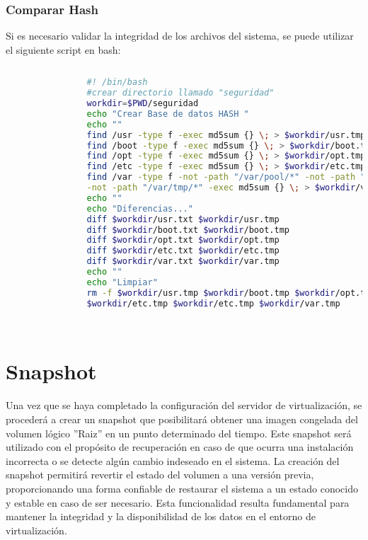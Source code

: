 			
			\subsubsection{Comparar Hash}
			
			Si es necesario validar la integridad de los archivos del sistema, se puede utilizar el siguiente script en bash:
			
			\vspace{0.3cm}
			\begin{lstlisting}[language=Bash, caption=Comparar Hash]
				
				#! /bin/bash
				#crear directorio llamado "seguridad"
				workdir=$PWD/seguridad
				echo "Crear Base de datos HASH "
				echo ""
				find /usr -type f -exec md5sum {} \; > $workdir/usr.tmp
				find /boot -type f -exec md5sum {} \; > $workdir/boot.tmp
				find /opt -type f -exec md5sum {} \; > $workdir/opt.tmp
				find /etc -type f -exec md5sum {} \; > $workdir/etc.tmp
				find /var -type f -not -path "/var/pool/*" -not -path "/var/log/*" \
				-not -path "/var/tmp/*" -exec md5sum {} \; > $workdir/var.tmp
				echo ""
				echo "Diferencias..."
				diff $workdir/usr.txt $workdir/usr.tmp
				diff $workdir/boot.txt $workdir/boot.tmp
				diff $workdir/opt.txt $workdir/opt.tmp
				diff $workdir/etc.txt $workdir/etc.tmp
				diff $workdir/var.txt $workdir/var.tmp
				echo ""
				echo "Limpiar"
				rm -f $workdir/usr.tmp $workdir/boot.tmp $workdir/opt.tmp \
				$workdir/etc.tmp $workdir/etc.tmp $workdir/var.tmp
				
				
			\end{lstlisting}	
		
		\section{Snapshot}
		
	Una vez que se haya completado la configuración del servidor de virtualización, se procederá a crear un snapshot que posibilitará obtener una imagen congelada del volumen lógico ''Raiz'' en un punto determinado del tiempo. Este snapshot será utilizado con el propósito de recuperación en caso de que ocurra una instalación incorrecta o se detecte algún cambio indeseado en el sistema. La creación del snapshot permitirá revertir el estado del volumen a una versión previa, proporcionando una forma confiable de restaurar el sistema a un estado conocido y estable en caso de ser necesario. Esta funcionalidad resulta fundamental para mantener la integridad y la disponibilidad de los datos en el entorno de virtualización.\par
	
